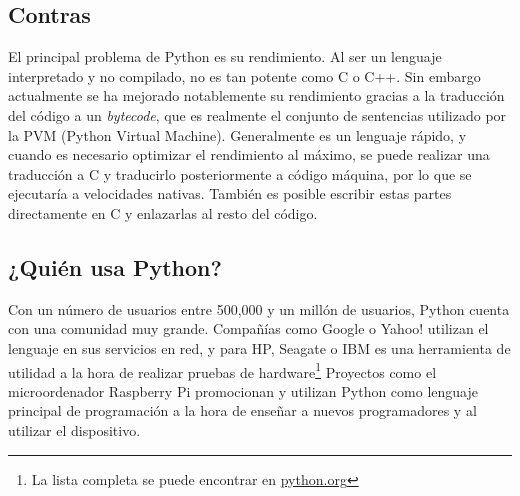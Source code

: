 \documentclass[12pt]{article} %
\begin{document}

\subsection{Contras} %

El principal problema de Python es su rendimiento. Al ser un lenguaje interpretado y no compilado, no es tan potente como C o C++. Sin embargo actualmente se ha mejorado notablemente su rendimiento gracias a la traducción del código a un \textit{bytecode}, que es realmente el conjunto de sentencias utilizado por la PVM (Python Virtual Machine).
Generalmente es un lenguaje rápido, y cuando es necesario optimizar el rendimiento al máximo, se puede realizar una traducción a C y traducirlo posteriormente a código máquina, por lo que se ejecutaría a velocidades nativas. También es posible escribir estas partes directamente en C y enlazarlas al resto del código.


\subsection{¿Quién usa Python?} %

Con un número de usuarios entre 500,000 y un millón de usuarios, Python cuenta con una comunidad muy grande. Compañías como Google o Yahoo! utilizan el lenguaje en sus servicios en red, y para HP, Seagate o IBM es una herramienta de utilidad a la hora de realizar pruebas de hardware\footnote{La lista completa se puede encontrar en \href{http://www.python.org}{python.org}}
Proyectos como el microordenador Raspberry Pi promocionan y utilizan Python como lenguaje principal de programación a la hora de enseñar a nuevos programadores y al utilizar el dispositivo.
%
%
%
%

%
\end{document}
